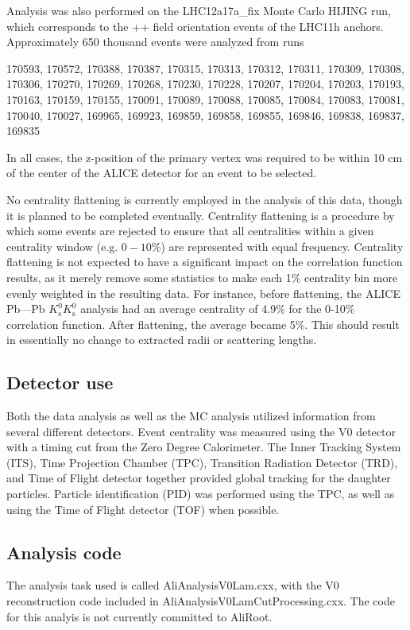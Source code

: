 Analysis was also performed on the LHC12a17a\_fix Monte Carlo HIJING run, which corresponds to the ++ field orientation events of the LHC11h anchors.  Approximately 650 thousand events were analyzed from runs

170593, 170572, 170388, 170387, 170315, 170313, 170312, 170311, 170309, 170308, 170306, 170270, 170269, 170268, 170230, 170228, 170207, 170204, 170203, 170193, 170163, 170159, 170155, 170091, 170089, 170088, 170085, 170084, 170083, 170081, 170040, 170027, 169965, 169923, 169859, 169858, 169855, 169846, 169838, 169837, 169835

In all cases, the z-position of the primary vertex was required to be within 10 cm of the center of the ALICE detector for an event to be selected.  

No centrality flattening is currently employed in the analysis of this data, though it is planned to be completed eventually.  Centrality flattening is a procedure by which some events are rejected to ensure that all centralities within a given centrality window (e.g. $0-10\%$) are represented with equal frequency.  Centrality flattening is not expected to have a significant impact on the correlation function results, as it merely remove some statistics to make each 1\% centrality bin more evenly weighted in the resulting data.  For instance, before flattening, the ALICE Pb---Pb $K^0_\mathrm{s}K^0_\mathrm{s}$ analysis had an average centrality of 4.9\% for the 0-10\% correlation function.  After flattening, the average became 5\%.  This should result in essentially no change to extracted radii or scattering lengths.

\subsection{Detector use}
Both the data analysis as well as the MC analysis utilized information from several different detectors.  Event centrality was measured using the V0 detector with a timing cut from the Zero Degree Calorimeter.  The Inner Tracking System (ITS), Time Projection Chamber (TPC), Transition Radiation Detector (TRD), and Time of Flight detector together provided global tracking for the daughter particles.  Particle identification (PID) was performed using the TPC, as well as using the Time of Flight detector (TOF) when possible.

\subsection{Analysis code}
The analysis task used is called AliAnalysisV0Lam.cxx, with the V0 reconstruction code included in AliAnalysisV0LamCutProcessing.cxx.  The code for this analyis is not currently committed to AliRoot.

